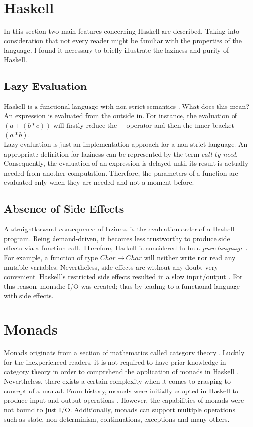 \documentclass[a4paper, onecolumn]{article}
\begin{document}
    \section{Haskell}
    
    In this section two main features concerning Haskell are described. Taking into consideration that not every reader might be familiar with the properties of the language, I found it necessary to briefly illustrate the laziness and purity of Haskell.  
    
    \subsection{Lazy Evaluation}
    
    Haskell is a functional language with non-strict semantics \cite{history}. What does this mean? An expression is evaluated from the outside in. For instance, the evaluation of \textit{$(a + (b * c))$} will firstly reduce the \textit{$+$} operator and then the inner bracket \textit{$(a * b)$}. \\
    Lazy evaluation is just an implementation approach for a non-strict language. An appropriate definition for laziness can be represented by the term \textit{call-by-need}. Consequently, the evaluation of an expression is delayed until its result is actually needed from another computation. Therefore, the parameters of a function are evaluated only when they are needed and not a moment before.
    
    \subsection{Absence of Side Effects}
    
    A straightforward consequence of laziness is the evaluation order of a Haskell program. Being demand-driven, it becomes less trustworthy to produce side effects via a function call. Therefore, Haskell is considered to be a \textit{pure language} \cite{history}. For example, a function of type $Char \rightarrow Char$ will neither write nor read any mutable variables. Nevertheless, side effects are without any doubt very convenient. Haskell's restricted side effects resulted in a slow input/output \cite{history}. For this reason, monadic I/O was created; thus by leading to a functional language with side effects. 
    \section{Monads}
    Monads originate from a section of mathematics called category theory \cite{categorytheory}. Luckily for the inexperienced readers, it is not required to have prior knowledge in category theory in order to comprehend the application of monads in Haskell \cite{original}. 
    Nevertheless, there exists a certain complexity when it comes to grasping to concept of a monad. From history, monads were initially adopted in Haskell to produce input and output operations \cite{history}. However, the capabilities of monads were not bound to just I/O. Additionally, monads can support multiple operations such as state, non-determinism, continuations, exceptions and many others.
\end{document}
